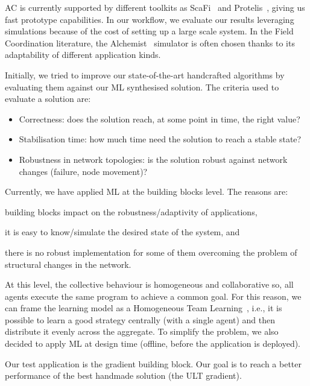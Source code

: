 \documentclass[conference]{IEEEtran}
\begin{document}
AC is currently supported by different toolkits as ScaFi~\cite{DBLP:conf/ecoop/CasadeiV16} and Protelis~\cite{DBLP:conf/sac/PianiniVB15}, giving us fast prototype capabilities.
%
In our workflow, we evaluate our results leveraging simulations because of the cost of setting up a large scale system.
%
In the Field Coordination literature, the Alchemist~\cite{alchemist-jos2013} simulator is often chosen thanks to its adaptability of different application kinds. %

Initially, we tried to improve our state-of-the-art handcrafted algorithms by evaluating them against our ML synthesised solution.
%
The criteria used to evaluate a solution are:
\begin{itemize}
    \item Correctness: does the solution reach, at some point in time, the right value?
    \item Stabilisation time: how much time need the solution to reach a stable state?
    \item Robustness in network topologies: is the solution robust against network changes (failure, node movement)?
\end{itemize}

Currently, we have applied ML at the building blocks level.
The reasons are:
\begin{enumerate*}[label=(\roman*)]
\item building blocks impact on the robustness/adaptivity of applications,
\item it is easy to know/simulate the desired state of the system, and
\item there is no robust implementation for some of them overcoming the problem of structural changes in the network.
\end{enumerate*}
%
At this level, the collective behaviour is homogeneous and collaborative so, all agents execute the same program to achieve a common goal.
%
For this reason, we can frame the learning model as a Homogeneous Team Learning~\cite{DBLP:journals/aamas/PanaitL05}, i.e., it is possible to learn a good strategy centrally (with a single agent) and then distribute it evenly across the aggregate.
%
To simplify the problem, we also decided to apply ML at design time (offline, before the application is deployed).

Our test application is the gradient building block. %
%
%
%
Our goal is to reach a better performance of the best handmade solution (the ULT gradient).
\end{document}
